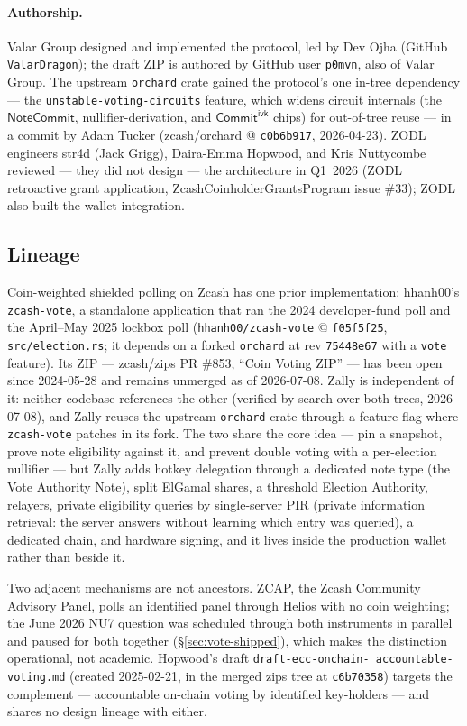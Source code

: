 \documentclass[11pt,a4paper]{article}
\theoremstyle{definition}
\newcommand{\NoteCommit}{\ensuremath{\mathsf{NoteCommit}}}
\newcommand{\CommitIvk}{\ensuremath{\mathsf{Commit}^{\mathsf{ivk}}}}
\begin{document}
\paragraph{Authorship.} Valar Group designed and implemented the protocol,
led by Dev Ojha (GitHub \texttt{ValarDragon}); the draft ZIP is authored by
GitHub user \texttt{p0mvn}, also of Valar Group. The upstream
\texttt{orchard} crate gained the protocol's one in-tree dependency --- the
\texttt{unstable-voting-circuits} feature, which widens circuit internals
(the \NoteCommit{}, nullifier-derivation, and \CommitIvk{} chips) for
out-of-tree reuse --- in a commit by Adam Tucker (zcash/orchard @
\texttt{c0b6b917}, 2026-04-23). ZODL engineers str4d (Jack Grigg),
Daira-Emma Hopwood, and Kris Nuttycombe reviewed --- they did not design ---
the architecture in Q1~2026 (ZODL retroactive grant application,
ZcashCoinholderGrantsProgram issue \#33); ZODL also built the wallet
integration.

\subsection{Lineage}\label{sec:vote-lineage}

Coin-weighted shielded polling on Zcash has one prior implementation:
hhanh00's \texttt{zcash-vote}, a standalone application that ran the 2024
developer-fund poll and the April--May 2025 lockbox poll
(\texttt{hhanh00/zcash-vote} @ \texttt{f05f5f25},
\texttt{src/election.rs}; it depends on a forked \texttt{orchard} at rev
\texttt{75448e67} with a \texttt{vote} feature). Its ZIP --- zcash/zips PR
\#853, ``Coin Voting ZIP'' --- has been open since 2024-05-28 and remains
unmerged as of 2026-07-08. Zally is independent of it: neither codebase
references the other (verified by search over both trees, 2026-07-08), and
Zally reuses the upstream \texttt{orchard} crate through a feature flag
where \texttt{zcash-vote} patches in its fork. The two share the
core idea --- pin a snapshot, prove note eligibility against it, and prevent
double voting with a per-election nullifier --- but Zally adds hotkey
delegation through a dedicated note type (the Vote Authority Note), split
ElGamal shares, a threshold Election Authority, relayers, private
eligibility queries by single-server PIR (private information retrieval:
the server answers without learning which entry was queried), a dedicated
chain, and hardware signing, and it lives inside the production wallet
rather than beside it.

Two adjacent mechanisms are not ancestors. ZCAP, the Zcash Community
Advisory Panel, polls an identified panel through Helios with no coin
weighting; the June 2026 NU7 question was scheduled through both
instruments in parallel and paused for both together
(\S\ref{sec:vote-shipped}), which makes the distinction operational, not
academic. Hopwood's
draft \texttt{draft-ecc-\allowbreak onchain-\allowbreak
accountable-\allowbreak voting.md} (created 2025-02-21,
in the merged zips tree at \texttt{c6b70358}) targets the complement ---
accountable on-chain voting by identified key-holders --- and shares no
design lineage with either.
\end{document}
